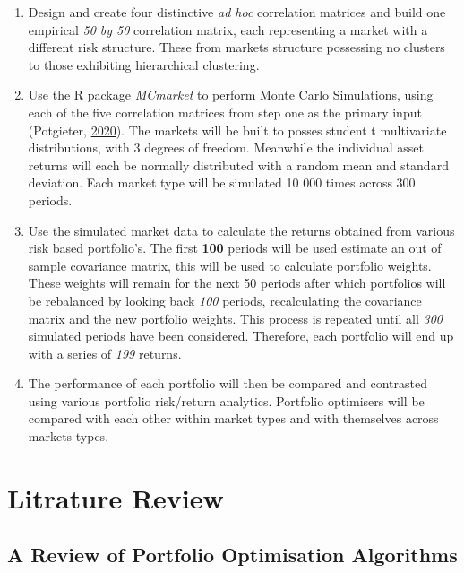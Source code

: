 \documentclass[11pt,preprint, authoryear]{elsarticle}
\numberwithin{equation}{section}
\numberwithin{figure}{section}
\numberwithin{table}{section}
\begin{document}
\begin{enumerate}
\def\labelenumi{\arabic{enumi}.}
\item
  Design and create four distinctive \emph{ad hoc} correlation matrices
  and build one empirical \emph{50 by 50} correlation matrix, each
  representing a market with a different risk structure. These from
  markets structure possessing no clusters to those exhibiting
  hierarchical clustering.
\item
  Use the R package \emph{MCmarket} to perform Monte Carlo Simulations,
  using each of the five correlation matrices from step one as the
  primary input (Potgieter, \protect\hyperlink{ref-MCmarket}{2020}). The
  markets will be built to posses student t multivariate distributions,
  with 3 degrees of freedom. Meanwhile the individual asset returns will
  each be normally distributed with a random mean and standard
  deviation. Each market type will be simulated 10 000 times across 300
  periods.
\item
  Use the simulated market data to calculate the returns obtained from
  various risk based portfolio's. The first \textbf{100} periods will be
  used estimate an out of sample covariance matrix, this will be used to
  calculate portfolio weights. These weights will remain for the next 50
  periods after which portfolios will be rebalanced by looking back
  \emph{100} periods, recalculating the covariance matrix and the new
  portfolio weights. This process is repeated until all \emph{300}
  simulated periods have been considered. Therefore, each portfolio will
  end up with a series of \emph{199} returns.
\item
  The performance of each portfolio will then be compared and contrasted
  using various portfolio risk/return analytics. Portfolio optimisers
  will be compared with each other within market types and with
  themselves across markets types.
\end{enumerate}

\hypertarget{litrature-review}{%
\section{\texorpdfstring{Litrature Review
\label{lit}}{Litrature Review }}\label{litrature-review}}

\hypertarget{a-review-of-portfolio-optimisation-algorithms}{%
\subsection{A Review of Portfolio Optimisation
Algorithms}\label{a-review-of-portfolio-optimisation-algorithms}}
\end{document}
